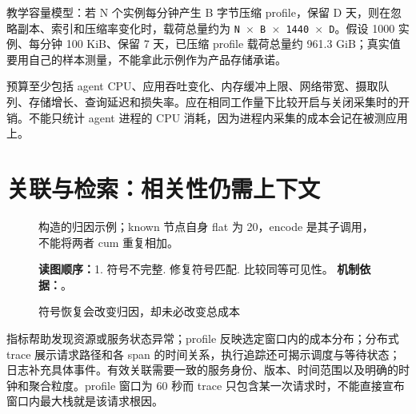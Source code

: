 \documentclass[UTF8,fontset=fandol,openany,11pt]{ctexbook}
\begin{document}
教学容量模型：若 N 个实例每分钟产生 B 字节压缩 profile，保留 D 天，则在忽略副本、索引和压缩率变化时，载荷总量约为 \texttt{N \ensuremath{\times} B \ensuremath{\times} 1440 \ensuremath{\times} D}。假设 1000 实例、每分钟 100 KiB、保留 7 天，已压缩 profile 载荷总量约 961.3 GiB；真实值要用自己的样本测量，不能拿此示例作为产品存储承诺。

预算至少包括 agent CPU、应用吞吐变化、内存缓冲上限、网络带宽、摄取队列、存储增长、查询延迟和损失率。应在相同工作量下比较开启与关闭采集时的开销。不能只统计 agent 进程的 CPU 消耗，因为进程内采集的成本会记在被测应用上。

\section{关联与检索：相关性仍需上下文}
\begin{figure}[H]
\centering
{}
\caption{符号恢复会改变归因，却未必改变总成本}\label{fig:12-unknown}
\begin{minipage}{0.96\linewidth}\footnotesize 构造的归因示例；known 节点自身 flat 为 20，encode 是其子调用，不能将两者 cum 重复相加。

\textbf{读图顺序：}1. 符号不完整. 修复符号匹配. 比较同等可见性。
\textbf{机制依据：}\cite{proj-pprof}。
\end{minipage}
\end{figure}
指标帮助发现资源或服务状态异常；profile 反映选定窗口内的成本分布；分布式 trace 展示请求路径和各 span 的时间关系，执行追踪还可揭示调度与等待状态；日志补充具体事件。有效关联需要一致的服务身份、版本、时间范围以及明确的时钟和聚合粒度。profile 窗口为 60 秒而 trace 只包含某一次请求时，不能直接宣布窗口内最大栈就是该请求根因。
\end{document}
